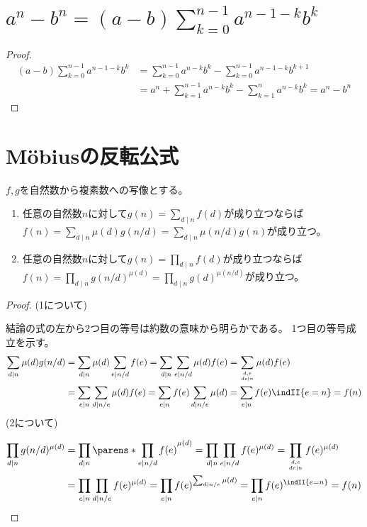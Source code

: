     \section{\texorpdfstring{$a^n-b^n = (a-b)\sum_{k=0}^{n-1} a^{n-1-k}b^k$}{a\string^n-b\string^nの分解}}
        \begin{proof}
            \begin{align*}
                (a-b)\sum_{k=0}^{n-1} a^{n-1-k}b^k &= \sum_{k=0}^{n-1} a^{n-k}b^k - \sum_{k=0}^{n-1} a^{n-1-k}b^{k+1} \\
                &= a^n + \sum_{k=1}^{n-1} a^{n-k}b^k - \sum_{k=1}^{n} a^{n-k}b^{k} = a^n - b^n
            \end{align*}
        \end{proof}
    \section{M\"obiusの反転公式}
        \begin{shadebox}
            $f,g$を自然数から複素数への写像とする。
            \begin{enumerate}
                \item 任意の自然数$n$に対して$g(n) = \sum_{d \mid n}f(d)$が成り立つならば$f(n) = \sum_{d \mid n} \mu(d)g(n/d) = \sum_{d \mid n} \mu(n/d)g(n)$が成り立つ。
                \item 任意の自然数$n$に対して$g(n) = \prod_{d \mid n}f(d)$が成り立つならば$f(n) = \prod_{d \mid n} g(n/d)^{\mu(d)} = \prod_{d \mid n} g(d)^{\mu(n/d)}$が成り立つ。
            \end{enumerate}
        \end{shadebox}
        \begin{proof}
            (1について)
            \par
            結論の式の左から2つ目の等号は約数の意味から明らかである。
            1つ目の等号成立を示す。
            \begin{align*}
                \sum_{d \mid n} \mu(d)g(n/d) &= \sum_{d \mid n} \mu(d)\sum_{e \mid n/d} f(e) = \sum_{d \mid n} \sum_{e \mid n/d} \mu(d)f(e) = \sum_{\genfrac{}{}{0pt}{}{d,e}{de \mid n}} \mu(d)f(e) \\
                &= \sum_{e \mid n} \sum_{d \mid n/e} \mu(d)f(e) = \sum_{e \mid n} f(e) \sum_{d \mid n/e} \mu(d) = \sum_{e \mid n} f(e) \indII{e=n} = f(n)
            \end{align*}
            \newline
            \newline
            (2について)
            \par
            \begin{align*}
                \prod_{d \mid n} g(n/d)^{\mu(d)} &= \prod_{d \mid n} \parens*{\prod_{e \mid n/d} f(e)}^{\mu(d)} = \prod_{d \mid n} \prod_{e \mid n/d} f(e)^{\mu(d)} = \prod_{\genfrac{}{}{0pt}{}{d,e}{de \mid n}} f(e)^{\mu(d)} \\
                &= \prod_{e \mid n} \prod_{d \mid n/e} f(e)^{\mu(d)} = \prod_{e \mid n} f(e)^{\sum_{d \mid n/e} \mu(d)} = \prod_{e \mid n} f(e)^{\indII{e=n}} = f(n)
            \end{align*}
        \end{proof}
